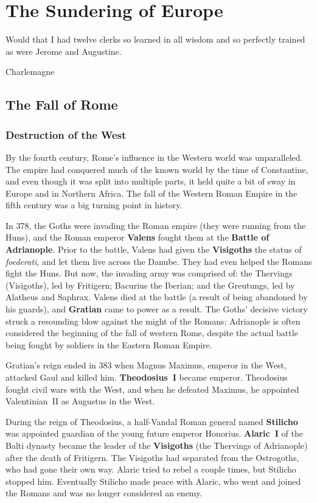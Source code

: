 \chapter{The Sundering of Europe}

\epigraph{%
  Would that I had twelve clerks so learned in all wisdom and so perfectly trained as were Jerome and Augustine.
}{Charlemagne}

\section{The Fall of Rome}

\subsection*{Destruction of the West}

By the fourth century, Rome's influence in the Western world was unparalleled.
The empire had conquered much of the known world by the time of Constantine,
and even though it was split into multiple parts, it held quite a bit of sway
in Europe and in Northern Africa.
The fall of the Western Roman Empire in the fifth century was a big turning point in history.

In 378, the Goths were invading the Roman empire (they were running from the Huns),
and the Roman emperor \textbf{Valens} fought them at the \textbf{Battle of Adrianople}.
Prior to the battle, Valens had given the \textbf{Visigoths} the status of \textit{foederati},
and let them live across the Danube.
They had even helped the Romans fight the Huns.
But now, the invading army was comprised of:
the Thervings (Visigoths), led by Fritigern;
Bacurius the Iberian;
and the Greutungs, led by Alatheus and Saphrax.
Valens died at the battle (a result of being abandoned by his guards),
and \textbf{Gratian} came to power as a result.
The Goths' decisive victory struck a resounding blow against the might of the Romans;
Adrianople is often considered the beginning of the fall of western Rome,
despite the actual battle being fought by soldiers in the Eastern Roman Empire.

Gratian's reign ended in 383 when Magnus Maximus, emperor in the West, attacked Gaul and killed him.
\textbf{Theodosius~I} became emperor.
Theodosius fought civil wars with the West,
and when he defeated Maximus, he appointed Valentinian~II as Augustus in the West.

During the reign of Theodosius, a half-Vandal Roman general named \textbf{Stilicho}
was appointed guardian of the young future emperor Honorius.
\textbf{Alaric~I} of the Balti dynasty became the leader of the \textbf{Visigoths}
(the Thervings of Adrianople)
after the death of Fritigern.
The Visigoths had separated from the Ostrogoths, who had gone their own way.
Alaric tried to rebel a couple times, but Stilicho stopped him.
Eventually Stilicho made peace with Alaric, who went and joined the Romans and was no longer considered an enemy.

